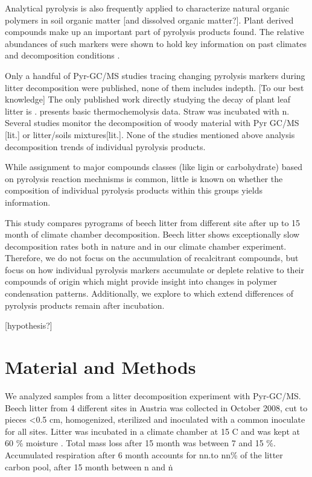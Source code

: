 \documentclass[preprint,review,12pt]{elsarticle}
\begin{document}
Analytical pyrolysis is also frequently applied to characterize natural organic polymers in soil organic matter [and dissolved organic matter?]. Plant derived compounds make up an important part of pyrolysis products found. The relative abundances of such markers were shown to hold key information on past climates and decomposition conditions \cite{i.e. Kuder1998, Schellekens2009, Schellekens2011}. 

Only a handful of Pyr-GC/MS studies tracing changing pyrolysis markers during litter decomposition were published, none of them includes indepth. [To our best knowledge] The only published work directly studying the decay of plant leaf litter is \cite{Franchini2002}.  presents basic thermochemolysis data.  Straw was incubated with n. Several studies monitor the decomposition of woody material with Pyr GC/MS [lit.] or litter/soils mixtures[lit.]. None of the studies mentioned above analysis decomposition trends of individual pyrolysis products.

While assignment to major compounds classes (like ligin or carbohydrate) based on pyrolysis reaction mechnisms is common, little is known on whether the composition of individual pyrolysis products within this groups yields information. 

This study compares pyrograms of beech litter from different site after up to 15 month of climate chamber decomposition. Beech litter shows exceptionally slow decomposition rates both in nature \citep{Klotzbucher2011} and in our climate chamber experiment. Therefore, we do not focus on the accumulation of recalcitrant compounds, but focus on how individual pyrolysis markers accumulate or deplete relative to their compounds of origin which might provide insight into changes in polymer condensation patterns. Additionally, we explore to which extend differences of pyrolysis products remain after incubation.

[hypothesis?]

\section{Material and Methods}

We analyzed samples from a litter decomposition experiment with Pyr-GC/MS. Beech litter from 4 different sites in Austria was collected in October 2008, cut to pieces \textless 0.5 cm, homogenized, sterilized and inoculated with a common inoculate for all sites. Litter was incubated in a climate chamber at 15 \textdegree C and was kept at 60 \% moisture \citep{Wanek2010}.
Total mass loss after 15 month was between 7 and 15 \%.
Accumulated respiration after 6 month accounts for nn.to nn\% of the litter carbon pool, after 15 month between n and n\.
\end{document}
